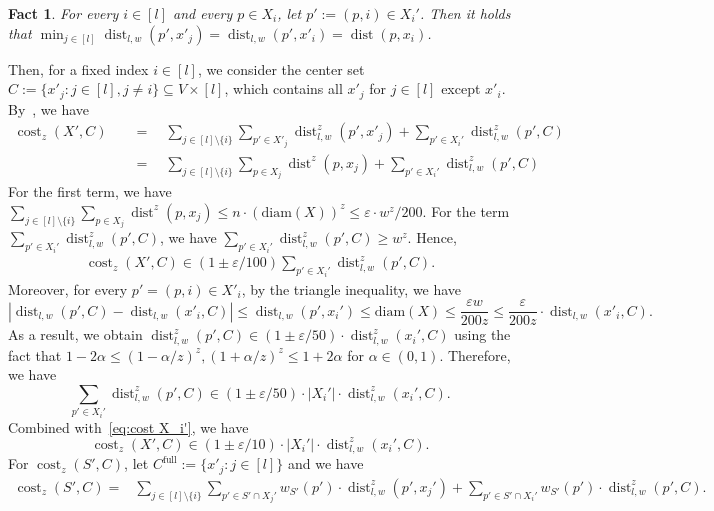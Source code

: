 \documentclass[letterpaper,11pt]{article}
\theoremstyle{plain}
\newtheorem{fact}[theorem]{Fact}
\theoremstyle{definition}
\theoremstyle{remark}
\DeclareMathOperator{\cost}{cost}
\DeclareMathOperator{\dist}{dist}
\newcommand{\diam}{\mathrm{diam}}
\newcommand{\eps}{\varepsilon}
\begin{document}
\begin{fact}
\label{claim:closest center}
For every $i\in [l]$ and every $p\in X_i$, let $p':= (p,i) \in X_i'$. Then it holds that $\min_{j\in [l]} \dist_{l,w}(p',x'_j) = \dist_{l,w}(p',x'_i) = \dist(p,x_i)$.
\end{fact}
Then, for a fixed index $i\in [l]$, we consider the center set $C:=\{x'_j: j\in [l],j\neq i \}\subseteq V\times [l]$, which contains all $x'_j$ for $j\in [l]$ except $x'_i$. 
By~, we have
\begin{align*}
\cost_z(X',C)\quad&=\quad \sum_{j\in [l]\setminus\{i\}  }\sum_{p'\in X'_j}\dist^z_{l,w}(p',x'_j) + \sum_{p'\in X_i'} \dist^z_{l,w}(p', C)\\
&=\quad \sum_{j\in [l]\setminus \{i\}}\sum_{p\in X_j}\dist^z(p,x_j) + \sum_{p'\in X_i'} \dist^z_{l,w}(p', C)
\end{align*}
For the first term, we have $\sum_{j\in [l]\setminus \{i\}}\sum_{p\in X_j}\dist^z(p,x_j)\le n\cdot (\diam(X))^z\le \eps\cdot w^z/200$.
For the term $\sum_{p'\in X_i'} \dist^z_{l,w}(p', C)$, we have $\sum_{p'\in X_i'} \dist^z_{l,w}(p', C)\ge w^z$.
Hence, 
\begin{align}
\label{eq:cost X_i'}
\cost_z(X',C)\in (1\pm \eps/100)\sum_{p'\in X_i'} \dist^z_{l,w}(p', C).
\end{align}
Moreover, for every $p'=(p,i)\in X'_i$, by the triangle inequality, we have 
\begin{equation*}
|\dist_{l,w}(p', C) - \dist_{l,w}(x'_i,C) |\le \dist_{l,w}(p', x_i')\le \diam(X)\le \frac{\eps w}{200z} \le \frac{\eps}{200z}\cdot \dist_{l,w}(x'_i,C).
\end{equation*}
As a result, we obtain $\dist_{l,w}^z(p',C)\in (1\pm \eps/50)\cdot \dist_{l,w}^z(x_i',C)$ using the fact that $1-2\alpha\le (1-\alpha/z)^z, (1+\alpha/z)^z\le 1+2\alpha$ for $\alpha\in (0,1)$. Therefore, we have
\begin{equation*}
\sum_{p'\in X_i'} \dist^z_{l,w}(p', C)\in (1\pm \eps/50)\cdot |X_i'|\cdot \dist^z_{l,w}(x_i',C).
\end{equation*}
Combined with~\eqref{eq:cost X_i'}, we have 
\begin{equation}
\label{eq:cost X'}
\cost_z(X',C)\in (1\pm \eps/10)\cdot |X_i'|\cdot \dist^z_{l,w}(x_i',C).
\end{equation}
For $\cost_z(S',C)$, let $C^\mathrm{full}:=\{x'_j:j\in [l]\}$ and we have 
\begin{align*}
    \cost_z(S',C) =& \sum_{j\in [l]\setminus\{i\}} \sum_{p'\in S'\cap X_j'} w_{S'}(p')\cdot \dist^z_{l,w}(p',x_j') + \sum_{p'\in S'\cap X_i'} w_{S'}(p')\cdot \dist_{l,w}^z(p',C).
\end{align*}
\end{document}
